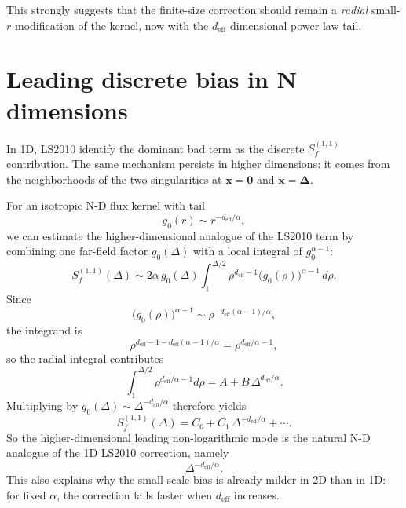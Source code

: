 \documentclass[11pt]{article}
\begin{document}
This strongly suggests that the finite-size correction should remain a \emph{radial}
small-$r$ modification of the kernel, now with the $d_{\mathrm{eff}}$-dimensional
power-law tail.

\section{Leading discrete bias in N dimensions}

In 1D, LS2010 identify the dominant bad term as the discrete
\(S_f^{(1,1)}\) contribution.  The same mechanism persists in higher dimensions:
it comes from the neighborhoods of the two singularities at
\(\bm x=\bm 0\) and \(\bm x=\bm \Delta\).

For an isotropic N-D flux kernel with tail
\begin{equation}
 g_0(r) \sim r^{-d_{\mathrm{eff}}/\alpha},
\end{equation}
we can estimate the higher-dimensional analogue of the LS2010 term by combining
one far-field factor $g_0(\Delta)$ with a local integral of $g_0^{\alpha-1}$:
\begin{equation}
S_f^{(1,1)}(\Delta)
\sim
2\alpha\, g_0(\Delta)
\int_1^{\Delta/2}
\rho^{d_{\mathrm{eff}}-1}
\bigl(g_0(\rho)\bigr)^{\alpha-1}
\,d\rho.
\end{equation}
Since
\begin{equation}
\bigl(g_0(\rho)\bigr)^{\alpha-1}
\sim
\rho^{-d_{\mathrm{eff}}(\alpha-1)/\alpha},
\end{equation}
the integrand is
\begin{equation}
\rho^{d_{\mathrm{eff}}-1-d_{\mathrm{eff}}(\alpha-1)/\alpha}
=
\rho^{d_{\mathrm{eff}}/\alpha - 1},
\end{equation}
so the radial integral contributes
\begin{equation}
\int_1^{\Delta/2} \rho^{d_{\mathrm{eff}}/\alpha -1} d\rho
=
A + B\,\Delta^{d_{\mathrm{eff}}/\alpha}.
\end{equation}
Multiplying by
\(g_0(\Delta)\sim \Delta^{-d_{\mathrm{eff}}/\alpha}\)
therefore yields
\begin{equation}
S_f^{(1,1)}(\Delta)
=
C_0 + C_1\,\Delta^{-d_{\mathrm{eff}}/\alpha} + \cdots .
\end{equation}
So the higher-dimensional leading non-logarithmic mode is the natural N-D analogue
of the 1D LS2010 correction, namely
\begin{equation}
\Delta^{-d_{\mathrm{eff}}/\alpha}.
\end{equation}
This also explains why the small-scale bias is already milder in 2D than in 1D:
for fixed $\alpha$, the correction falls faster when $d_{\mathrm{eff}}$ increases.
\end{document}

